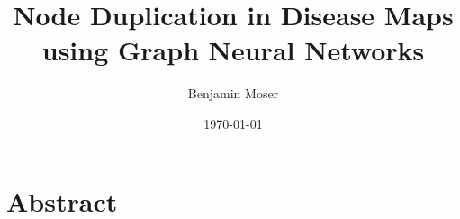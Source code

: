 \documentclass[
	fontsize=10pt, %
	twoside=false, %
	secnumdepth=1, %
  toc=indentunnumbered %
]{kaobook}
\begin{document}

\title[Node Duplication in Disease Maps using Graph Neural Networks]{Node
  Duplication in Disease Maps \\ using Graph Neural Networks}
\author[BM]{Benjamin Moser}
\date{\today}


\frontmatter %





\maketitle


\chapter*{Abstract}
\end{document}
